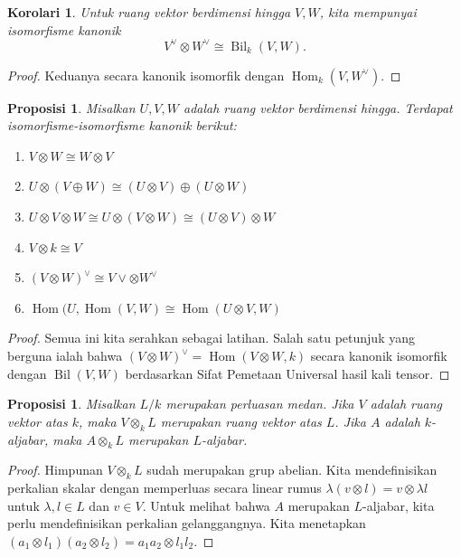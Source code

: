 \documentclass[12pt]{article}
\theoremstyle{plain}
\newtheorem{proposition}[theorem]{Proposisi}
\newtheorem{corollary}[theorem]{Korolari}
\theoremstyle{definition}
\theoremstyle{remark}
\numberwithin{equation}{section}
\begin{document}
\begin{corollary}
Untuk ruang vektor berdimensi hingga $V, W$,
kita mempunyai isomorfisme kanonik
\[
V^\vee \otimes W^\vee \cong \operatorname{Bil}_k(V,W) .
\]
\end{corollary}

\begin{proof}
Keduanya secara kanonik isomorfik dengan $\operatorname{Hom}_k(V,W^\vee)$.
\end{proof}

\begin{proposition}
Misalkan $U,V,W$ adalah ruang vektor berdimensi hingga.
Terdapat isomorfisme-isomorfisme kanonik berikut:
\begin{enumerate}
\item $V \otimes W \cong W \otimes V$
\item $U \otimes (V \oplus W) \cong (U \otimes V) \oplus (U \otimes W)$
\item $U \otimes V \otimes W \cong U \otimes (V \otimes W)
\cong (U \otimes V) \otimes W$
\item $V \otimes k \cong V$
\item $(V \otimes W)^\vee \cong V\vee \otimes W^\vee$
\item $\operatorname{Hom}(U,\operatorname{Hom}(V,W)
\cong \operatorname{Hom}(U \otimes V, W)$
\end{enumerate}
\end{proposition}

\begin{proof}
Semua ini kita serahkan sebagai latihan.
Salah satu petunjuk yang berguna ialah bahwa
$(V \otimes W)^\vee = \operatorname{Hom}(V \otimes W,k)$
secara kanonik isomorfik dengan $\operatorname{Bil}(V,W)$
berdasarkan Sifat Pemetaan Universal hasil kali tensor.
\end{proof}

\begin{proposition}
Misalkan $L/k$ merupakan perluasan medan.
Jika $V$ adalah ruang vektor atas $k$, maka $V \otimes_k L$ merupakan ruang vektor atas $L$.
Jika $A$ adalah $k$-aljabar, maka $A \otimes_k L$ merupakan $L$-aljabar.
\end{proposition}

\begin{proof}
Himpunan $V \otimes_k L$ sudah merupakan grup abelian.
Kita mendefinisikan perkalian skalar dengan memperluas secara linear
rumus $\lambda(v\otimes l)=v \otimes \lambda l$
untuk $\lambda, l \in L$ dan $v \in V$.
Untuk melihat bahwa $A$ merupakan $L$-aljabar, kita perlu mendefinisikan perkalian gelanggangnya.
Kita menetapkan $(a_1 \otimes l_1)(a_2 \otimes l_2)=a_1a_2 \otimes l_1l_2$.
\end{proof}
\end{document}
